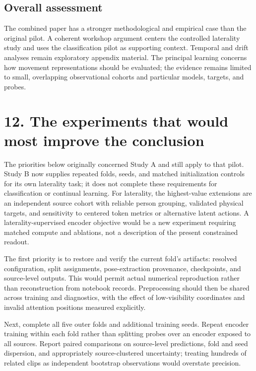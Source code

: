 \documentclass[11pt,letterpaper]{article}
\begin{document}
\subsection{Overall assessment}\label{overall-assessment}

The combined paper has a stronger methodological and empirical case than
the original pilot. A coherent workshop argument centers the controlled
laterality study and uses the classification pilot as supporting
context. Temporal and drift analyses remain exploratory appendix
material. The principal learning concerns how movement representations
should be evaluated; the evidence remains limited to small, overlapping
observational cohorts and particular models, targets, and probes.

\section{12. The experiments that would most improve the
conclusion}\label{the-experiments-that-would-most-improve-the-conclusion}

The priorities below originally concerned Study A and still apply to
that pilot. Study B now supplies repeated folds, seeds, and matched
initialization controls for its own laterality task; it does not
complete these requirements for classification or continual learning.
For laterality, the highest-value extensions are an independent source
cohort with reliable person grouping, validated physical targets, and
sensitivity to centered token metrics or alternative latent actions. A
laterality-supervised encoder objective would be a new experiment
requiring matched compute and ablations, not a description of the
present constrained readout.

The first priority is to restore and verify the current fold's
artifacts: resolved configuration, split assignments, pose-extraction
provenance, checkpoints, and source-level outputs. This would permit
actual numerical reproduction rather than reconstruction from notebook
records. Preprocessing should then be shared across training and
diagnostics, with the effect of low-visibility coordinates and invalid
attention positions measured explicitly.

Next, complete all five outer folds and additional training seeds.
Repeat encoder training within each fold rather than splitting probes
over an encoder exposed to all sources. Report paired comparisons on
source-level predictions, fold and seed dispersion, and appropriately
source-clustered uncertainty; treating hundreds of related clips as
independent bootstrap observations would overstate precision.
\end{document}
